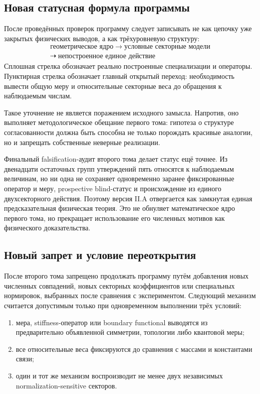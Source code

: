 \documentclass[12pt,a4paper]{article}
\begin{document}
\subsection{Новая статусная формула программы}

После проведённых проверок программу следует записывать не как цепочку уже закрытых физических выводов, а как трёхуровневую структуру:
\begin{equation}
\boxed{
\begin{gathered}
\text{геометрическое ядро}
\;\longrightarrow\;
\text{условные секторные модели}
\\[2mm]
\dashrightarrow\;
\text{непостроенное единое действие}
\end{gathered}
}
\end{equation}
Сплошная стрелка обозначает реально построенные специализации и операторы. Пунктирная стрелка обозначает главный открытый переход: необходимость вывести общую меру и относительные секторные веса до обращения к наблюдаемым числам.

Такое уточнение не является поражением исходного замысла. Напротив, оно выполняет методологическое обещание первого тома: гипотеза о структуре согласованности должна быть способна не только порождать красивые аналогии, но и запрещать собственные неверные реализации.

Финальный falsification-аудит второго тома делает статус ещё точнее. Из двенадцати остаточных групп утверждений пять относятся к наблюдаемым величинам, но ни одна не сохраняет одновременно заранее фиксированные оператор и меру, prospective blind-статус и происхождение из единого двухсекторного действия. Поэтому версия II.A отвергается как замкнутая единая предсказательная физическая теория. Это не обнуляет математическое ядро первого тома, но прекращает использование его численных мотивов как физического доказательства.

\subsection{Новый запрет и условие переоткрытия}

После второго тома запрещено продолжать программу путём добавления новых численных совпадений, новых секторных коэффициентов или специальных нормировок, выбранных после сравнения с экспериментом. Следующий механизм считается допустимым только при одновременном выполнении трёх условий:
\begin{enumerate}
    \item мера, stiffness-оператор или boundary functional выводятся из предварительно объявленной симметрии, топологии либо квантовой меры;
    \item все относительные веса фиксируются до сравнения с массами и константами связи;
    \item один и тот же механизм воспроизводит не менее двух независимых normalization-sensitive секторов.
\end{enumerate}
\end{document}
